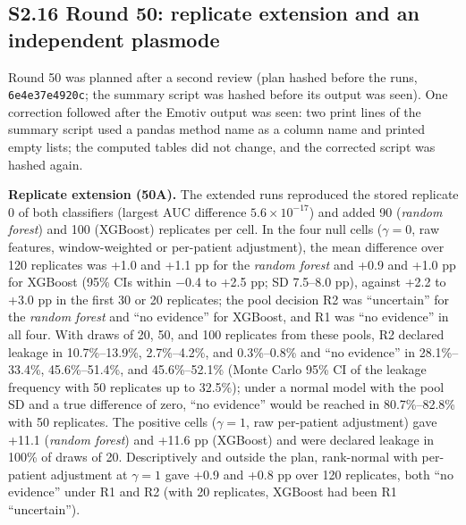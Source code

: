 \subsection*{S2.16 Round 50: replicate extension and an independent plasmode}
Round 50 was planned after a second review (plan hashed before the runs, \texttt{6e4e37e4920c}; the summary script was hashed before its output was seen). One correction followed after the Emotiv output was seen: two print lines of the summary script used a pandas method name as a column name and printed empty lists; the computed tables did not change, and the corrected script was hashed again.

\textbf{Replicate extension (50A).} The extended runs reproduced the stored replicate 0 of both classifiers (largest AUC difference $5.6\times10^{-17}$) and added 90 (\textit{random forest}) and 100 (XGBoost) replicates per cell. In the four null cells ($\gamma=0$, raw features, window-weighted or per-patient adjustment), the mean difference over 120 replicates was +1.0 and +1.1 pp for the \textit{random forest} and +0.9 and +1.0 pp for XGBoost (95\% CIs within $-$0.4 to +2.5 pp; SD 7.5--8.0 pp), against +2.2 to +3.0 pp in the first 30 or 20 replicates; the pool decision R2 was ``uncertain'' for the \textit{random forest} and ``no evidence'' for XGBoost, and R1 was ``no evidence'' in all four. With draws of 20, 50, and 100 replicates from these pools, R2 declared leakage in 10.7\%--13.9\%, 2.7\%--4.2\%, and 0.3\%--0.8\% and ``no evidence'' in 28.1\%--33.4\%, 45.6\%--51.4\%, and 45.6\%--52.1\% (Monte Carlo 95\% CI of the leakage frequency with 50 replicates up to 32.5\%); under a normal model with the pool SD and a true difference of zero, ``no evidence'' would be reached in 80.7\%--82.8\% with 50 replicates. The positive cells ($\gamma=1$, raw per-patient adjustment) gave +11.1 (\textit{random forest}) and +11.6 pp (XGBoost) and were declared leakage in 100\% of draws of 20. Descriptively and outside the plan, rank-normal with per-patient adjustment at $\gamma=1$ gave +0.9 and +0.8 pp over 120 replicates, both ``no evidence'' under R1 and R2 (with 20 replicates, XGBoost had been R1 ``uncertain'').

